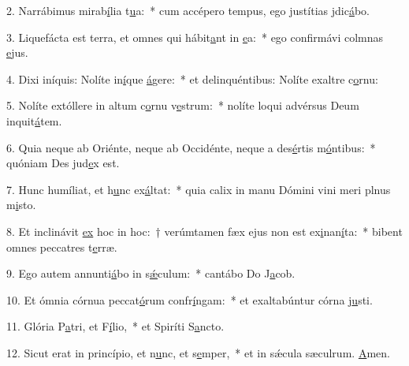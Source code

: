 2. Narrábimus mirab\uline{í}lia t\uline{u}a:~* cum accépero tempus, ego justítias jdic\uline{á}bo.\par 
3. Liquefácta est terra, et omnes qui hábit\uline{a}nt in \uline{e}a:~* ego confirmávi colmnas \uline{e}jus.\par 
4. Dixi iníquis: Nolíte in\uline{í}que \uline{á}gere:~* et delinquéntibus: Nolíte exaltre c\uline{o}rnu:\par 
5. Nolíte extóllere in altum c\uline{o}rnu v\uline{e}strum:~* nolíte loqui advérsus Deum inquit\uline{á}tem.\par 
6. Quia neque ab Oriénte, neque ab Occidénte, neque a des\uline{é}rtis m\uline{ó}ntibus:~* quóniam Des jud\uline{e}x est.\par 
7. Hunc humíliat, et h\uline{u}nc ex\uline{á}ltat:~* quia calix in manu Dómini vini meri plnus m\uline{i}sto.\par 
8. Et inclinávit \uline{ex} hoc in hoc:~† verúmtamen fæx ejus non est ex\uline{i}nan\uline{í}ta:~* bibent omnes peccatres t\uline{e}rræ.\par 
9. Ego autem annunti\uline{á}bo in s\uline{ǽ}culum:~* cantábo Do J\uline{a}cob.\par 
10. Et ómnia córnua peccat\uline{ó}rum confr\uline{í}ngam:~* et exaltabúntur córna j\uline{u}sti.\par 
11. Glória P\uline{a}tri, et F\uline{í}lio,~* et Spiríti S\uline{a}ncto.\par 
12. Sicut erat in princípio, et n\uline{u}nc, et s\uline{e}mper,~* et in sǽcula sæculrum. \uline{A}men.\par 
